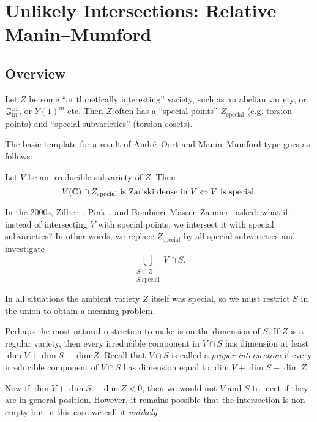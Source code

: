 

\chapter{Unlikely Intersections: Relative Manin--Mumford}

\section{Overview}

Let $Z$ be some ``arithmetically interesting'' variety, such as an
abelian variety, or ${\mathbb{G}}_{\mathrm{m}}^m$, or $Y(1)^m$ etc. Then $Z$
often has a ``special points'' $Z_{\mathrm{special}}$ (e.g. torsion
points) and ``special subvarieties'' (torsion cosets).

The basic template for a result of Andr\'e--Oort and Manin--Mumford
type goes as follows:

Let $V$ be an irreducible subvariety of
$Z$. Then
\begin{equation*}
  V({\mathbb{C}}) \cap Z_{\mathrm{special}}\text{ is Zariski dense in
    $V$}\Leftrightarrow \text{$V$ is special}.
\end{equation*}

In the 2000s, Zilber~\cite{Zilber}, Pink~\cite{Pink}, and
Bombieri--Masser--Zannier~\cite{BMZgeometric} asked: what if instead
of intersecting $V$ with special points, we intersect it with special
subvarieties? In other words, we replace $Z_{\mathrm{special}}$ by all
special subvarieties and investigate
\begin{equation*}
  \bigcup_{\substack{S\subset Z \\ \text{$S$ special}}} V\cap S.
\end{equation*}

In all situations the ambient variety $Z$ itself was special, so we must restrict $S$ in
the union to obtain a meaning problem.

Perhaps the most natural restriction to make is on the dimension of
$S$. If $Z$ is a regular variety, then every irreducible component in
$V\cap S$ has dimension at least $\dim V+\dim S - \dim Z$. Recall that
$V\cap S$ is called a \emph{proper intersection} if every irreducible
component of $V\cap S$ has dimension equal to $\dim V+\dim S- \dim Z$.

Now if $\dim V + \dim S -\dim Z < 0$, then we would not $V$ and $S$ to
meet if they are in general position. However, it remains possible
that the intersection is non-empty but in this case we call it
\emph{unlikely}.

